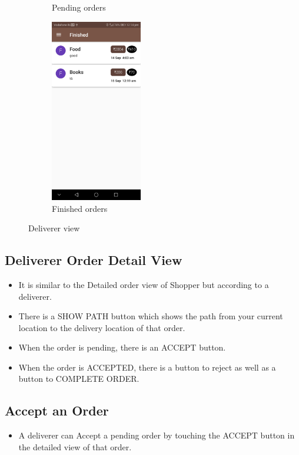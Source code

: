 \documentclass{report}
\begin{document}
\begin{figure}[h!]
\begin{subfigure}[h!]{.24\textwidth}
\caption{\centering \tiny Pending orders}
\end{subfigure}
\begin{subfigure}[h!]{.24\textwidth}
\centering
\includegraphics[width=4cm]{finished_deliverer.jpg}
\caption{\centering \tiny Finished orders}
\end{subfigure}
\caption{\tiny Deliverer view} 
\label{fig:NASA_Logo}
\end{figure}


\subsection{Deliverer Order Detail View}
\begin{itemize}
\item It is similar to the Detailed order view of Shopper but according to a deliverer.
\item There is a SHOW PATH button which shows the path from your current location to the delivery location of that order.
\item When the order is pending, there is an ACCEPT button.
\item When the order is ACCEPTED, there is a button to reject as well as a button to COMPLETE ORDER.
\end{itemize}

\subsection{Accept an Order}
\begin{itemize}
\item A deliverer can Accept a pending order by touching the ACCEPT button in the detailed view of that order.
\end{itemize}
\end{document}
